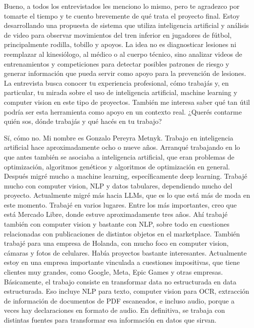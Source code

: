 \begin{description}[leftmargin=0pt, itemindent=\parindent, labelsep=0.5em, itemsep=0pt, parsep=0pt, topsep=0pt]
    \item[\textbf{Entrevistador:}] Bueno, a todos los entrevistados les menciono lo mismo, pero te agradezco por tomarte el tiempo y te cuento brevemente de qué trata el proyecto final. Estoy desarrollando una propuesta de sistema que utiliza inteligencia artificial y análisis de video para observar movimientos del tren inferior en jugadores de fútbol, principalmente rodilla, tobillo y apoyos. La idea no es diagnosticar lesiones ni reemplazar al kinesiólogo, al médico o al cuerpo técnico, sino analizar videos de entrenamientos y competiciones para detectar posibles patrones de riesgo y generar información que pueda servir como apoyo para la prevención de lesiones. La entrevista busca conocer tu experiencia profesional, cómo trabajás y, en particular, tu mirada sobre el uso de inteligencia artificial, machine learning y computer vision en este tipo de proyectos. También me interesa saber qué tan útil podría ser esta herramienta como apoyo en un contexto real. ¿Querés contarme quién sos, dónde trabajás y qué hacés en tu trabajo?

    \item[\textbf{Gonzalo Pereyra Metnyk:}] Sí, cómo no. Mi nombre es Gonzalo Pereyra Metnyk. Trabajo en inteligencia artificial hace aproximadamente ocho o nueve años. Arranqué trabajando en lo que antes también se asociaba a inteligencia artificial, que eran problemas de optimización, algoritmos genéticos y algoritmos de optimización en general. Después migré mucho a machine learning, específicamente deep learning. Trabajé mucho con computer vision, NLP y datos tabulares, dependiendo mucho del proyecto. Actualmente migré más hacia LLMs, que es lo que está más de moda en este momento. Trabajé en varios lugares. Entre los más importantes, creo que está Mercado Libre, donde estuve aproximadamente tres años. Ahí trabajé también con computer vision y bastante con NLP, sobre todo en cuestiones relacionadas con publicaciones de distintos objetos en el marketplace. También trabajé para una empresa de Holanda, con mucho foco en computer vision, cámaras y fotos de celulares. Había proyectos bastante interesantes. Actualmente estoy en una empresa importante vinculada a cuestiones impositivas, que tiene clientes muy grandes, como Google, Meta, Epic Games y otras empresas. Básicamente, el trabajo consiste en transformar data no estructurada en data estructurada. Eso incluye NLP para texto, computer vision para OCR, extracción de información de documentos de PDF escaneados, e incluso audio, porque a veces hay declaraciones en formato de audio. En definitiva, se trabaja con distintas fuentes para transformar esa información en datos que sirvan.


\end{description}
